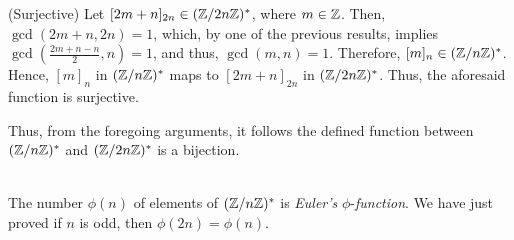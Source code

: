 \begin{xca}
\begin{itemize}
(Surjective) Let $[2m + n]_{2n} \in (\mathbb{Z}/{2n\mathbb{Z}})^*$, where $m \in \mathbb{Z}$. Then,
$\gcd(2m + n, 2n) = 1$, which, by one of the previous results, implies
$\gcd(\frac{2m + n - n}{2}, n) = 1$, and thus, $\gcd(m, n) = 1$. Therefore,
$[m]_n \in (\mathbb{Z}/{n\mathbb{Z}})^*$. Hence, $[m]_n$ in $(\mathbb{Z}/{n\mathbb{Z}})^*$ maps to
$[2m + n]_{2n}$ in $(\mathbb{Z}/{2n\mathbb{Z}})^*$. Thus, the aforesaid function is surjective.

Thus, from the foregoing arguments, it follows the defined function between
$(\mathbb{Z}/{n\mathbb{Z}})^*$ and $(\mathbb{Z}/{2n\mathbb{Z}})^*$ is a bijection.

~\\
The number $\phi(n)$ of elements of $(\mathbb{Z}/{n\mathbb{Z}})^*$ is \emph{Euler's}
$\phi$-\emph{function}. We have just proved if $n$ is odd, then $\phi(2n) =
\phi(n)$.
\end{itemize}
\end{xca}

